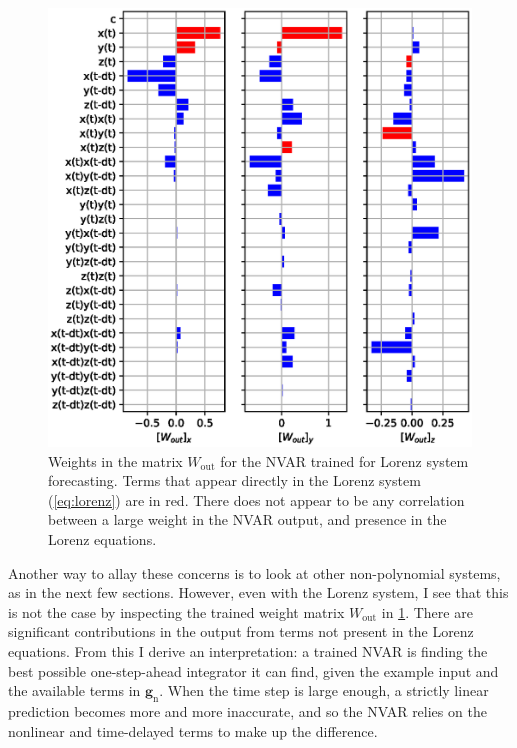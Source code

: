 \begin{figure}
  \includegraphics{figures/nvar-predict-lorenz-wout}
  \caption{Weights in the matrix $W_\text{out}$ for the NVAR trained
    for Lorenz system forecasting. Terms that appear directly in the
    Lorenz system (\cref{eq:lorenz}) are in red. There does not appear
    to be any correlation between a large weight in the NVAR output,
    and presence in the Lorenz equations.}
  \label{fig:nvar-predict-lorenz-wout}
\end{figure}

Another way to allay these concerns is to look at other non-polynomial
systems, as in the next few sections. However, even with the Lorenz
system, I see that this is not the case by inspecting the trained
weight matrix $W_\text{out}$ in
\cref{fig:nvar-predict-lorenz-wout}. There are significant contributions
in the output from terms not present in the Lorenz equations. From
this I derive an interpretation: a trained NVAR is finding the best
possible one-step-ahead integrator it can find, given the example
input and the available terms in $\bm{g}_\text{n}$. When the time step
is large enough, a strictly linear prediction becomes more and more
inaccurate, and so the NVAR relies on the nonlinear and time-delayed
terms to make up the difference.

